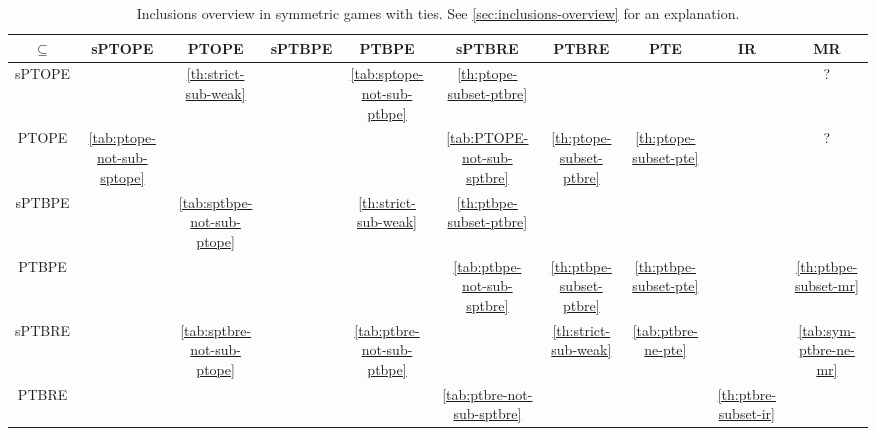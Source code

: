 \begin{sidewaystable}
	\caption{Inclusions overview in symmetric games with ties. See \autoref{sec:inclusions-overview} for an explanation.}
	\label{tab:overview-sym-dup}
	\hspace{-4cm}
	\begin{tabular}{|c|c|c|c|c|c|c|c|c|c|}
		\hline
		$\subseteq$  & sPTOPE & PTOPE & sPTBPE & PTBPE & sPTBRE & PTBRE & PTE & IR & MR \\
		\hline
		sPTOPE & \cellcolor{gray!30} & \cellcolor{green!30} \autoref{th:strict-sub-weak} & \cellcolor{red!15} & \cellcolor{red!25} \autoref{tab:sptope-not-sub-ptbpe} & \cellcolor{green!30} \autoref{th:ptope-subset-ptbre} & \cellcolor{green!15} & \cellcolor{green!15} & \cellcolor{green!15} & ? \\
		\hline
		PTOPE & \cellcolor{red!30} \autoref{tab:ptope-not-sub-sptope} & \cellcolor{gray!30} & \cellcolor{red!15} & \cellcolor{red!15} & \cellcolor{red!30} \autoref{tab:PTOPE-not-sub-sptbre} & \cellcolor{green!30} \autoref{th:ptope-subset-ptbre} & \cellcolor{green!30} \autoref{th:ptope-subset-pte} & \cellcolor{green!15} & ? \\
		\hline
		sPTBPE & \cellcolor{red!15} & \cellcolor{red!30} \autoref{tab:sptbpe-not-sub-ptope} & \cellcolor{gray!30} & \cellcolor{green!30} \autoref{th:strict-sub-weak} & \cellcolor{green!30} \autoref{th:ptbpe-subset-ptbre} & \cellcolor{green!15} & \cellcolor{green!15} & \cellcolor{green!15} & \cellcolor{green!15} \\
		\hline
		PTBPE & \cellcolor{red!15} & \cellcolor{red!15} & \cellcolor{red!15} & \cellcolor{gray!30} & \cellcolor{red!30} \autoref{tab:ptbpe-not-sub-sptbre} & \cellcolor{green!30} \autoref{th:ptbpe-subset-ptbre} & \cellcolor{green!30} \autoref{th:ptbpe-subset-pte} & \cellcolor{green!15} & \cellcolor{green!30} \autoref{th:ptbpe-subset-mr} \\
		\hline
		sPTBRE & \cellcolor{red!15} & \cellcolor{red!30} \autoref{tab:sptbre-not-sub-ptope} & \cellcolor{red!15} & \cellcolor{red!30} \autoref{tab:ptbre-not-sub-ptbpe} & \cellcolor{gray!30} & \cellcolor{green!30} \autoref{th:strict-sub-weak} & \cellcolor{red!30} \autoref{tab:ptbre-ne-pte} & \cellcolor{green!15} & \cellcolor{red!30} \autoref{tab:sym-ptbre-ne-mr} \\
		\hline
		PTBRE & \cellcolor{red!15} & \cellcolor{red!15} & \cellcolor{red!15} & \cellcolor{red!15} & \cellcolor{red!30} \autoref{tab:ptbre-not-sub-sptbre} & \cellcolor{gray!30} & \cellcolor{red!15} & \cellcolor{green!30} \autoref{th:ptbre-subset-ir} & \cellcolor{red!15} \\

\end{tabular}
\end{sidewaystable}
